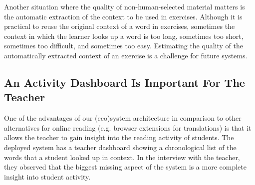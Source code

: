 Another situation where the quality of non-human-selected material matters is the automatic extraction of the context to be used in exercises. 
Although it is practical to reuse the original context of a word in exercises, sometimes the context in which the learner looks up a word is too long, sometimes too short, sometimes too difficult, and sometimes too easy. Estimating the quality of the automatically extracted context of an exercise is a challenge for future systems.



\subsection{An Activity Dashboard Is Important For The Teacher}
One of the advantages of our (eco)system architecture in comparison to other alternatives for online reading (e.g. browser extensions for translations) is that it allows the teacher to gain insight into the reading activity of students. The deployed system has a teacher dashboard showing a chronological list of the words that a student looked up in context. In the interview with the teacher, they observed that the biggest missing aspect of the system is a more complete insight into student activity. 










